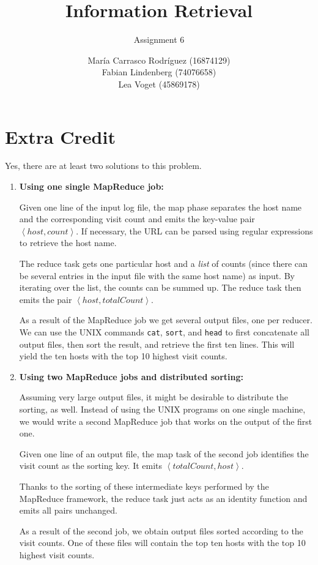 \documentclass[a4paper,11pt,oneside]{book}
\title{Information Retrieval }
\subtitle{Assignment 6}
\author{ María Carrasco Rodríguez (16874129) \\
		Fabian Lindenberg (74076658)\\
		Lea Voget (45869178)}
\begin{document}
\kostspieligmaketitle


\chapter{Extra Credit}
 
Yes, there are at least two solutions to this problem. 

\begin{enumerate}
	\item \textbf{Using one single MapReduce job:}
	
				Given one line of the input log file, the map phase separates the host name and the corresponding visit count and emits the key-value pair $\left\langle host, count\right\rangle$. If necessary, the URL can be parsed using regular expressions to retrieve the host name.
				
				The reduce task gets one particular host and a \emph{list} of counts (since there can be several entries in the input file with the same host name) as input. By iterating over the list, the counts can be summed up. The reduce task then emits the pair $\left\langle host, totalCount\right\rangle$. 
				
				As a result of the MapReduce job we get several output files, one per reducer. We can use the UNIX commands \texttt{cat}, \texttt{sort}, and \texttt{head} to first concatenate all output files, then sort the result, and retrieve the first ten lines. This will yield the ten hosts with the top 10 highest visit counts.
				
	\item \textbf{Using two MapReduce jobs and distributed sorting:}
	
				Assuming very large output files, it might be desirable to distribute the sorting, as well. Instead of using the UNIX programs on one single machine, we would write a second MapReduce job that works on the output of the first one. 
				
				Given one line of an output file, the map task of the second job identifies the visit count as the sorting key. It emits $\left\langle totalCount, host\right\rangle$. 
				
				Thanks to the sorting of these intermediate keys performed by the MapReduce framework, the reduce task just acts as an identity function and emits all pairs unchanged. 
				
				As a result of the second job, we obtain output files sorted according to the visit counts. One of these files will contain the top ten hosts with the top 10 highest visit counts. 
				
\end{enumerate}
\end{document}
